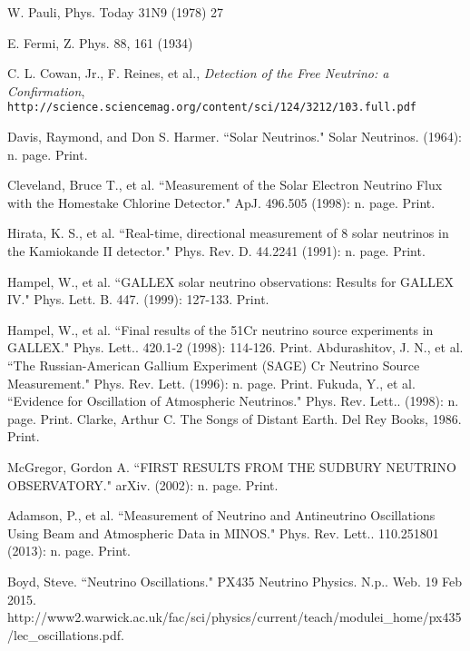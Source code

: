 \documentclass[12pt]{article}
\begin{document}
\newpage
\begin{thebibliography}{20} %
\singlespacing

W. Pauli, Phys. Today 31N9 (1978) 27

E. Fermi, Z. Phys. 88, 161 (1934)

  C. L. Cowan, Jr., F. Reines, et al., \emph{Detection of the Free Neutrino: a Confirmation}, \\
  \texttt{http://science.sciencemag.org/content/sci/124/3212/103.full.pdf}

Davis, Raymond, and Don S. Harmer. ``Solar Neutrinos." Solar Neutrinos. (1964): n. page. Print.

Cleveland, Bruce T., et al. ``Measurement of the Solar Electron Neutrino Flux with the Homestake Chlorine Detector." ApJ. 496.505 (1998): n. page. Print.

Hirata, K. S., et al. ``Real-time, directional measurement of 8 solar neutrinos in the Kamiokande II detector." Phys. Rev. D. 44.2241 (1991): n. page. Print.

Hampel, W., et al. ``GALLEX solar neutrino observations: Results for GALLEX IV." Phys. Lett. B. 447. (1999): 127-133. Print.

Hampel, W., et al. ``Final results of the 51Cr neutrino source experiments in GALLEX." Phys. Lett.. 420.1-2 (1998): 114-126. Print.
Abdurashitov, J. N., et al. ``The Russian-American Gallium Experiment (SAGE) Cr Neutrino Source Measurement."  Phys. Rev. Lett. (1996): n. page. Print.
Fukuda, Y., et al. ``Evidence for Oscillation of Atmospheric Neutrinos."  Phys. Rev. Lett.. (1998): n. page. Print.
Clarke, Arthur C. The Songs of Distant Earth. Del Rey Books, 1986. Print.

McGregor, Gordon A. ``FIRST RESULTS FROM THE SUDBURY NEUTRINO OBSERVATORY." arXiv. (2002): n. page. Print.

Adamson, P., et al. ``Measurement of Neutrino and Antineutrino Oscillations Using Beam and Atmospheric Data in MINOS."  Phys. Rev. Lett.. 110.251801 (2013): n. page. Print.

Boyd, Steve. ``Neutrino Oscillations." PX435 Neutrino Physics. N.p.. Web. 19 Feb 2015. http://www2.warwick.ac.uk/fac/sci/physics/current/teach/modulei\_home/px435/lec\_oscillations.pdf.


\end{thebibliography}
\end{document}
